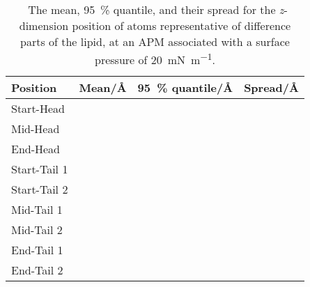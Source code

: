 \begin{table}
\centering
\small
  \caption{\ The mean, \SI{95}{\percent} quantile, and their spread for the \emph{z}-dimension position of atoms representative of difference parts of the lipid, at an APM associated with a surface pressure of \SI{20}{\milli\newton\per\meter}.}
  \label{tab:spread1}
  \begin{tabular}{llll}
    \hline
    Position & Mean/\si{\angstrom} & \SI{95}{\percent} quantile/\si{\angstrom} & Spread/\si{\angstrom} \\
    \hline
    Start-Head &  &  &  \\
    Mid-Head &  &  &  \\
    End-Head &  &  &  \\
    \hline
    Start-Tail 1 &  &  &  \\
    Start-Tail 2 &  &  &  \\
    Mid-Tail 1 &  &  &  \\
    Mid-Tail 2 &  &  &  \\
    End-Tail 1 &  &  &  \\
    End-Tail 2 &  &  &  \\
    \hline
  \end{tabular}
\end{table}
